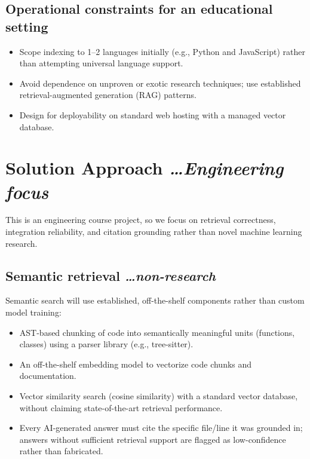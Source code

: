 \documentclass[11pt,a4paper]{article}
\newcommand{\BvrHint}[1]{%
  {\normalfont\normalsize\itshape\hfill #1}}
\begin{document}
\subsection{Operational constraints for an educational setting}
\begin{itemize}[leftmargin=0.7cm]
    \item Scope indexing to 1--2 languages initially (e.g., Python and JavaScript) rather than attempting universal language support.
    \item Avoid dependence on unproven or exotic research techniques; use established retrieval-augmented generation (RAG) patterns.
    \item Design for deployability on standard web hosting with a managed vector database.
\end{itemize}

\section{Solution Approach %
\BvrHint{\ldots Engineering focus}}
This is an engineering course project, so we focus on retrieval correctness, integration reliability, and citation grounding rather than novel machine learning research.

\subsection{Semantic retrieval %
\BvrHint{\ldots non-research}}
Semantic search will use established, off-the-shelf components rather than custom model training:
\begin{itemize}[leftmargin=0.7cm]
    \item AST-based chunking of code into semantically meaningful units (functions, classes) using a parser library (e.g., tree-sitter).
    \item An off-the-shelf embedding model to vectorize code chunks and documentation.
    \item Vector similarity search (cosine similarity) with a standard vector database, without claiming state-of-the-art retrieval performance.
    \item Every AI-generated answer must cite the specific file/line it was grounded in; answers without sufficient retrieval support are flagged as low-confidence rather than fabricated.
\end{itemize}
\end{document}
